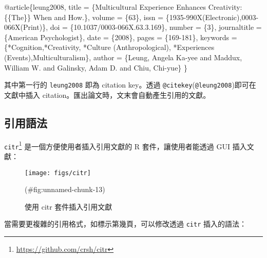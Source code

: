 \documentclass[oneside]{book}
\newenvironment{Shaded}{\begin{snugshade}}{\end{snugshade}}
\newcommand{\DataTypeTok}[1]{\textcolor[rgb]{0.13,0.29,0.53}{#1}}
\newcommand{\NormalTok}[1]{#1}
\newcommand{\OtherTok}[1]{\textcolor[rgb]{0.56,0.35,0.01}{#1}}
\newcommand{\VariableTok}[1]{\textcolor[rgb]{0.00,0.00,0.00}{#1}}
\renewcommand{\href}[2]{#2\footnote{\url{#1}}}
\begin{document}
\begin{Shaded}
\begin{Highlighting}[]
\VariableTok{@article}\NormalTok{\{}\OtherTok{leung2008}\NormalTok{,}
  \DataTypeTok{title}\NormalTok{ = \{Multicultural Experience Enhances Creativity: \{\{The\}\} When and How.\},}
  \DataTypeTok{volume}\NormalTok{ = \{63\},}
  \DataTypeTok{issn}\NormalTok{ = \{1935-990X(Electronic),0003-066X(Print)\},}
  \DataTypeTok{doi}\NormalTok{ = \{10.1037/0003-066X.63.3.169\},}
  \DataTypeTok{number}\NormalTok{ = \{3\},}
  \DataTypeTok{journaltitle}\NormalTok{ = \{American Psychologist\},}
  \DataTypeTok{date}\NormalTok{ = \{2008\},}
  \DataTypeTok{pages}\NormalTok{ = \{169-181\},}
  \DataTypeTok{keywords}\NormalTok{ = \{*Cognition,*Creativity,}
\NormalTok{    *Culture (Anthropological),}
\NormalTok{    *Experiences (Events),Multiculturalism\},}
  \DataTypeTok{author}\NormalTok{ = \{Leung, Angela Ka-yee and }
\NormalTok{    Maddux, William W. and }
\NormalTok{    Galinsky, Adam D. and Chiu, Chi-yue\}}
\NormalTok{\}}
\end{Highlighting}
\end{Shaded}

其中第一行的 \texttt{leung2008} 即為 citation key。透過 \texttt{@citekey}(\texttt{@leung2008})即可在文獻中插入 citation。匯出論文時，文末會自動產生引用的文獻。

\hypertarget{cite-syntax}{%
\subsection{引用語法}\label{cite-syntax}}

\href{https://github.com/crsh/citr}{\texttt{citr}} 是一個方便使用者插入引用文獻的 R 套件，讓使用者能透過 GUI 插入文獻：

\begin{figure}

{\centering \texttt{[image: figs/citr]} 

}

\caption{使用 citr 套件插入引用文獻}(\#fig:unnamed-chunk-13)
\end{figure}

當需要更複雜的引用格式，如標示第幾頁，可以修改透過 \texttt{citr} 插入的語法：
\end{document}
